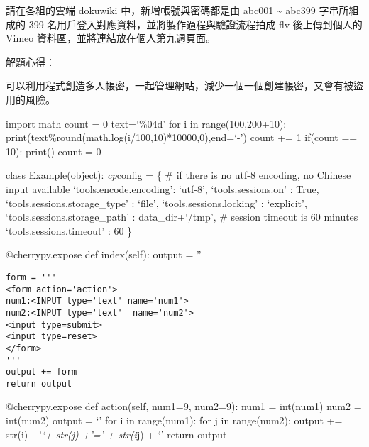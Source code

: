 \documentclass[]{article}
\newenvironment{Shaded}{}{}
\newcommand{\KeywordTok}[1]{\textcolor[rgb]{0.00,0.44,0.13}{\textbf{{#1}}}}
\newcommand{\DataTypeTok}[1]{\textcolor[rgb]{0.56,0.13,0.00}{{#1}}}
\newcommand{\DecValTok}[1]{\textcolor[rgb]{0.25,0.63,0.44}{{#1}}}
\newcommand{\CharTok}[1]{\textcolor[rgb]{0.25,0.44,0.63}{{#1}}}
\newcommand{\StringTok}[1]{\textcolor[rgb]{0.25,0.44,0.63}{{#1}}}
\newcommand{\CommentTok}[1]{\textcolor[rgb]{0.38,0.63,0.69}{\textit{{#1}}}}
\newcommand{\OtherTok}[1]{\textcolor[rgb]{0.00,0.44,0.13}{{#1}}}
\newcommand{\NormalTok}[1]{{#1}}
\begin{document}
請在各組的雲端 dokuwiki 中，新增帳號與密碼都是由 abc001
\textasciitilde{} abc399 字串所組成的 399
名用戶登入對應資料，並將製作過程與驗證流程拍成 flv 後上傳到個人的 Vimeo
資料區，並將連結放在個人第九週頁面。

\begin{Shaded}
\end{Shaded}

解題心得：

可以利用程式創造多人帳密，一起管理網站，減少一個一個創建帳密，又會有被盜用的風險。

import math count = 0 text=`\%04d' for i in range(100,200+10):
print(text\%round(math.log(i/100,10)*10000,0),end=`-') count += 1
if(count == 10): print() count = 0

class Example(object): \emph{cp}config = \{ \# if there is no utf-8
encoding, no Chinese input available `tools.encode.encoding': `utf-8',
`tools.sessions.on' : True, `tools.sessions.storage\_type' : `file',
`tools.sessions.locking' : `explicit', `tools.sessions.storage\_path' :
data\_dir+`/tmp', \# session timeout is 60 minutes
`tools.sessions.timeout' : 60 \}

@cherrypy.expose def index(self): output = ''

\begin{verbatim}
form = '''
<form action='action'>
num1:<INPUT type='text' name='num1'>
num2:<INPUT type='text'  name='num2'>
<input type=submit>
<input type=reset>
</form>
'''
output += form
return output
\end{verbatim}

@cherrypy.expose def action(self, num1=9, num2=9): num1 = int(num1) num2
= int(num2) output = `' for i in range(num1): for j in range(num2):
output += str(i) +'\emph{`+ str(j) +'=' + str(i}j) + `' return output
\end{document}
